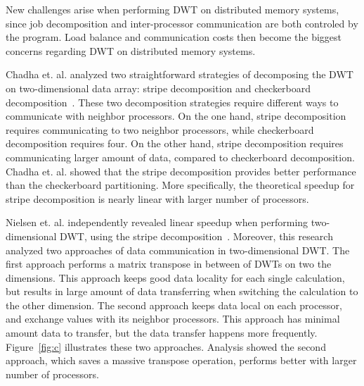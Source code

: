 New challenges arise when performing DWT on distributed memory systems,
since job decomposition and inter-processor communication are both controled
by the program.
%
Load balance and communication costs then become the biggest concerns 
regarding DWT on distributed memory systems.

Chadha et. al. analyzed two straightforward strategies of decomposing 
the DWT on two-dimensional data array: stripe decomposition and
checkerboard decomposition~\cite{chadha2002scalable}.
%
These two decomposition strategies require different ways to communicate
with neighbor processors.
%
On the one hand, stripe decomposition requires communicating to two 
neighbor processors, while checkerboard decomposition requires four.
%
On the other hand, stripe decomposition requires communicating larger
amount of data, compared to checkerboard decomposition.
%
Chadha et. al. showed that the stripe decomposition provides better
performance than the checkerboard partitioning.
%
More specifically, the theoretical speedup for stripe decomposition 
is nearly linear with larger number of processors.

Nielsen et. al. independently revealed linear speedup when performing 
two-dimensional DWT, using the stripe decomposition~\cite{nielsen1997scalable}.
%
Moreover, this research analyzed two approaches of data communication in
two-dimensional DWT.
%
The first approach performs a matrix transpose in between of DWTs on
two the dimensions. 
%
This approach keeps good data locality for each single calculation, but 
results in large amount of data transferring when switching the calculation
to the other dimension.
%
The second approach keeps data local on each processor, and exchange values
with its neighbor processors.
%
This approach has minimal amount data to transfer, but the data transfer happens 
more frequently.
%
Figure~\ref{fig:c} illustrates these two approaches. 
%
Analysis showed the second approach, which saves a massive transpose operation,
performs better with larger number of processors.

